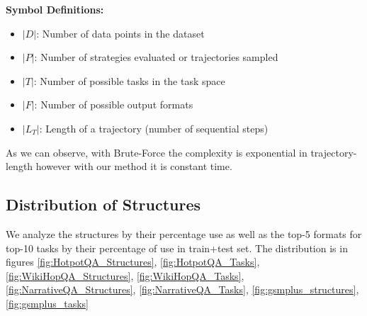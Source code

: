 \textbf{Symbol Definitions:}
\begin{itemize}
    \item $|D|$: Number of data points in the dataset
    \item $|P|$: Number of strategies evaluated or trajectories sampled
    \item $|T|$: Number of possible tasks in the task space
    \item $|F|$: Number of possible output formats
    \item $|L_T|$: Length of a trajectory (number of sequential steps)
\end{itemize}

As we can observe, with Brute-Force the complexity is exponential in trajectory-length however with our method it is constant time.




\subsection{Distribution of Structures}\label{distribution_of_structures}
We analyze the structures by their percentage use as well as the top-5 formats for top-10 tasks by their percentage of use in train+test set. The distribution is in figures \ref{fig:HotpotQA_Structures}, \ref{fig:HotpotQA_Tasks}, 
\ref{fig:WikiHopQA_Structures},
\ref{fig:WikiHopQA_Tasks},
\ref{fig:NarrativeQA_Structures},
\ref{fig:NarrativeQA_Tasks},
\ref{fig:gsmplus_structures},
\ref{fig:gsmplus_tasks}

